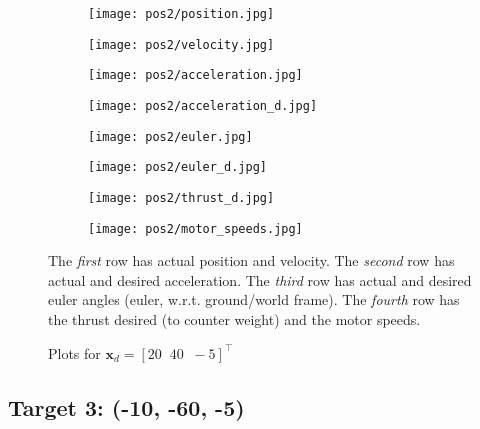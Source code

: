\begin{figure}[h]
    \centering
    \begin{subfigure}[b]{0.35\textwidth}
        \texttt{[image: pos2/position.jpg]}
    \end{subfigure}
    \begin{subfigure}[b]{0.35\textwidth}
        \texttt{[image: pos2/velocity.jpg]}
    \end{subfigure}
    \begin{subfigure}[b]{0.35\textwidth}
        \texttt{[image: pos2/acceleration.jpg]}
    \end{subfigure}
    \begin{subfigure}[b]{0.35\textwidth}
        \texttt{[image: pos2/acceleration\_d.jpg]}
    \end{subfigure}
    \begin{subfigure}[b]{0.35\textwidth}
        \texttt{[image: pos2/euler.jpg]}
    \end{subfigure}
    \begin{subfigure}[b]{0.35\textwidth}
        \texttt{[image: pos2/euler\_d.jpg]}
    \end{subfigure}
    \begin{subfigure}[b]{0.35\textwidth}
        \texttt{[image: pos2/thrust\_d.jpg]}
    \end{subfigure}
    \begin{subfigure}[b]{0.35\textwidth}
        \texttt{[image: pos2/motor\_speeds.jpg]}
    \end{subfigure}
    \caption{Plots for $\mathbf{x}_d = [20\;\;40\;\;-5]^\top$}
    \small
        The \emph{first} row has actual position and velocity.
        The \emph{second} row has actual and desired acceleration.
        The \emph{third} row has actual and desired euler angles (euler, w.r.t. ground/world frame).
        The \emph{fourth} row has the thrust desired (to counter weight) and the motor speeds.
\end{figure}

\pagebreak
\subsection{Target 3: (-10, -60, -5)}

